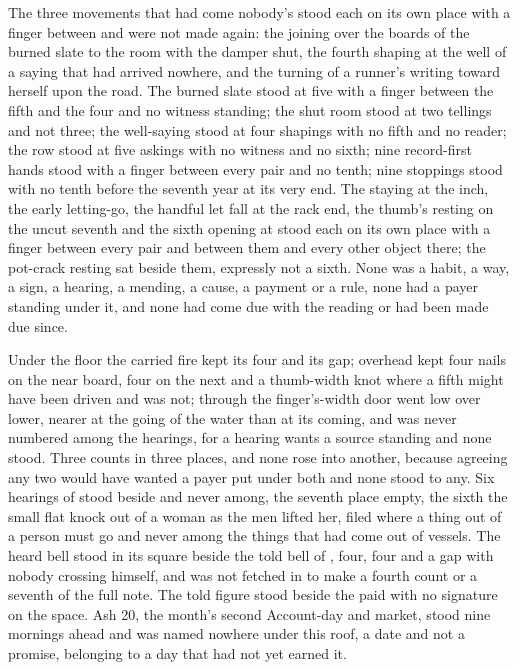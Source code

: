 The three movements that had come nobody's stood each on its own place with a finger between and were not made again: the joining over the boards of the burned slate to the room with the damper shut, the fourth shaping at the well of a saying that had arrived nowhere, and the turning of a runner's writing toward herself upon the road. The burned slate stood at five with a finger between the fifth and the four and no witness standing; the shut room stood at two tellings and not three; the well-saying stood at four shapings with no fifth and no reader; the row stood at five askings with no witness and no sixth; nine record-first hands stood with a finger between every pair and no tenth; nine stoppings stood with no tenth before the seventh year at its very end. The staying at the inch, the early letting-go, the handful let fall at the rack end, the thumb's resting on the uncut seventh and the sixth opening at  stood each on its own place with a finger between every pair and between them and every other object there; the pot-crack resting sat beside them, expressly not a sixth. None was a habit, a way, a sign, a hearing, a mending, a cause, a payment or a rule, none had a payer standing under it, and none had come due with the reading or had been made due since.

Under the floor the carried fire kept its four and its gap; overhead  kept four nails on the near board, four on the next and a thumb-width knot where a fifth might have been driven and was not; through the finger's-width door  went low over lower, nearer at the going of the water than at its coming, and was never numbered among the hearings, for a hearing wants a source standing and none stood. Three counts in three places, and none rose into another, because agreeing any two would have wanted a payer put under both and none stood to any. Six hearings of  stood beside and never among, the seventh place empty, the sixth the small flat knock out of a woman as the men lifted her, filed where a thing out of a person must go and never among the things that had come out of vessels. The heard bell stood in its square beside the told bell of , four, four and a gap with nobody crossing himself, and was not fetched in to make a fourth count or a seventh of the full note. The told figure stood beside the paid with no signature on the space. Ash 20, the month's second Account-day and market, stood nine mornings ahead and was named nowhere under this roof, a date and not a promise, belonging to a day that had not yet earned it.

